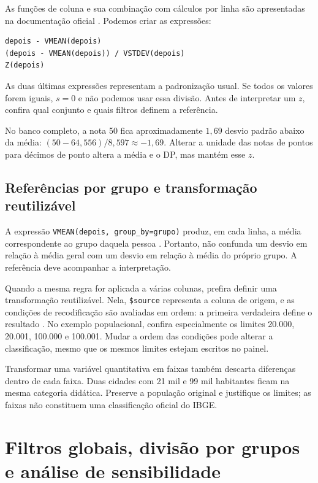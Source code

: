 As funções de coluna e sua combinação com cálculos por linha são apresentadas na documentação oficial \parencite{JamoviFuncoesLinhaColuna}. Podemos criar as expressões:
\begin{verbatim}
depois - VMEAN(depois)
(depois - VMEAN(depois)) / VSTDEV(depois)
Z(depois)
\end{verbatim}
As duas últimas expressões representam a padronização usual. Se todos os valores forem iguais, $s=0$ e não podemos usar essa divisão. Antes de interpretar um $z$, confira qual conjunto e quais filtros definem a referência.

No banco completo, a nota 50 fica aproximadamente $1{,}69$ desvio padrão abaixo da média: $(50-64{,}556)/8{,}597\approx-1{,}69$. Alterar a unidade das notas de pontos para décimos de ponto altera a média e o DP, mas mantém esse $z$.

\subsection{Referências por grupo e transformação reutilizável}

A expressão \texttt{VMEAN(depois, group\_by=grupo)} produz, em cada linha, a média correspondente ao grupo daquela pessoa \parencite{JamoviFuncoesLinhaColuna}. Portanto, não confunda um desvio em relação à média geral com um desvio em relação à média do próprio grupo. A referência deve acompanhar a interpretação.

Quando a mesma regra for aplicada a várias colunas, prefira definir uma transformação reutilizável. Nela, \texttt{\$source} representa a coluna de origem, e as condições de recodificação são avaliadas em ordem: a primeira verdadeira define o resultado \parencite{JamoviTransformadas}. No exemplo populacional, confira especialmente os limites 20.000, 20.001, 100.000 e 100.001. Mudar a ordem das condições pode alterar a classificação, mesmo que os mesmos limites estejam escritos no painel.

Transformar uma variável quantitativa em faixas também descarta diferenças dentro de cada faixa. Duas cidades com 21 mil e 99 mil habitantes ficam na mesma categoria didática. Preserve a população original e justifique os limites; as faixas não constituem uma classificação oficial do IBGE.

\section{Filtros globais, divisão por grupos e análise de sensibilidade}

